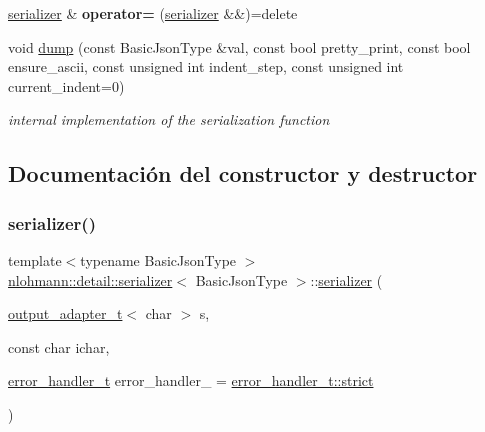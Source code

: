\begin{DoxyCompactItemize}
\mbox{\hyperlink{classnlohmann_1_1detail_1_1serializer}{serializer}} \& {\bfseries operator=} (\mbox{\hyperlink{classnlohmann_1_1detail_1_1serializer}{serializer}} \&\&)=delete
\item 
void \mbox{\hyperlink{classnlohmann_1_1detail_1_1serializer_a95460ebd1a535a543e5a0ec52e00f48b}{dump}} (const Basic\+Json\+Type \&val, const bool pretty\+\_\+print, const bool ensure\+\_\+ascii, const unsigned int indent\+\_\+step, const unsigned int current\+\_\+indent=0)
\begin{DoxyCompactList}\small\item\em internal implementation of the serialization function \end{DoxyCompactList}\end{DoxyCompactItemize}


\subsection{Documentación del constructor y destructor}
\mbox{\label{classnlohmann_1_1detail_1_1serializer_ac010525281d97867ee842da37294fe83}} 
\subsubsection{\texorpdfstring{serializer()}{serializer()}}
{\footnotesize\ttfamily template$<$typename Basic\+Json\+Type $>$ \\
\mbox{\hyperlink{classnlohmann_1_1detail_1_1serializer}{nlohmann\+::detail\+::serializer}}$<$ Basic\+Json\+Type $>$\+::\mbox{\hyperlink{classnlohmann_1_1detail_1_1serializer}{serializer}} (\begin{DoxyParamCaption}\item[{\mbox{\hyperlink{namespacenlohmann_1_1detail_a9b680ddfb58f27eb53a67229447fc556}{output\+\_\+adapter\+\_\+t}}$<$ char $>$}]{s,  }\item[{const char}]{ichar,  }\item[{\mbox{\hyperlink{namespacenlohmann_1_1detail_a5a76b60b26dc8c47256a996d18d967df}{error\+\_\+handler\+\_\+t}}}]{error\+\_\+handler\+\_\+ = {\ttfamily \mbox{\hyperlink{namespacenlohmann_1_1detail_a5a76b60b26dc8c47256a996d18d967dfa2133fd717402a7966ee88d06f9e0b792}{error\+\_\+handler\+\_\+t\+::strict}}} }\end{DoxyParamCaption})\hspace{0.3cm}{\ttfamily [inline]}}


